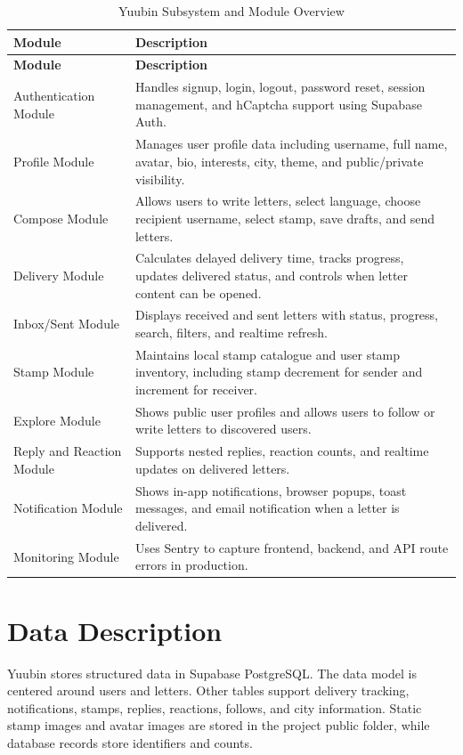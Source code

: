 ﻿\documentclass[12pt,a4paper]{report}
\begin{document}
\begin{longtable}{p{4cm} p{10cm}}
\caption{Yuubin Subsystem and Module Overview}
\label{tab:subsystems}\\
\toprule
\textbf{Module} & \textbf{Description} \\
\midrule
\endfirsthead
\toprule
\textbf{Module} & \textbf{Description} \\
\midrule
\endhead
Authentication Module & Handles signup, login, logout, password reset, session management, and hCaptcha support using Supabase Auth. \\
Profile Module & Manages user profile data including username, full name, avatar, bio, interests, city, theme, and public/private visibility. \\
Compose Module & Allows users to write letters, select language, choose recipient username, select stamp, save drafts, and send letters. \\
Delivery Module & Calculates delayed delivery time, tracks progress, updates delivered status, and controls when letter content can be opened. \\
Inbox/Sent Module & Displays received and sent letters with status, progress, search, filters, and realtime refresh. \\
Stamp Module & Maintains local stamp catalogue and user stamp inventory, including stamp decrement for sender and increment for receiver. \\
Explore Module & Shows public user profiles and allows users to follow or write letters to discovered users. \\
Reply and Reaction Module & Supports nested replies, reaction counts, and realtime updates on delivered letters. \\
Notification Module & Shows in-app notifications, browser popups, toast messages, and email notification when a letter is delivered. \\
Monitoring Module & Uses Sentry to capture frontend, backend, and API route errors in production. \\
\bottomrule
\end{longtable}

\section{Data Description}

Yuubin stores structured data in Supabase PostgreSQL. The data model is centered around users and letters. Other tables support delivery tracking, notifications, stamps, replies, reactions, follows, and city information. Static stamp images and avatar images are stored in the project public folder, while database records store identifiers and counts.
\end{document}
